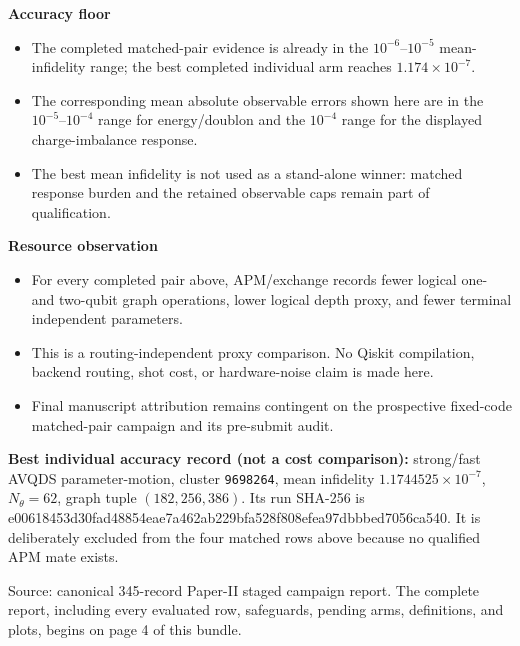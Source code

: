 \documentclass[9pt,letterpaper,landscape]{article}
\newcommand{\statusbox}[2]{\colorbox{#1}{\parbox{0.965\linewidth}{\strut #2\strut}}}
\begin{document}
\vspace{8pt}
\begin{minipage}[t]{0.49\linewidth}
{\large\bfseries\color{navy}Accuracy floor}
\begin{itemize}
  \item The completed matched-pair evidence is already in the \(10^{-6}\)--\(10^{-5}\) mean-infidelity range; the best completed individual arm reaches \(1.174\times10^{-7}\).
  \item The corresponding mean absolute observable errors shown here are in the \(10^{-5}\)--\(10^{-4}\) range for energy/doublon and the \(10^{-4}\) range for the displayed charge-imbalance response.
  \item The best mean infidelity is not used as a stand-alone winner: matched response burden and the retained observable caps remain part of qualification.
\end{itemize}
\end{minipage}\hfill
\begin{minipage}[t]{0.49\linewidth}
{\large\bfseries\color{navy}Resource observation}
\begin{itemize}
  \item For every completed pair above, APM/exchange records fewer logical one- and two-qubit graph operations, lower logical depth proxy, and fewer terminal independent parameters.
  \item This is a routing-independent proxy comparison. No Qiskit compilation, backend routing, shot cost, or hardware-noise claim is made here.
  \item Final manuscript attribution remains contingent on the prospective fixed-code matched-pair campaign and its pre-submit audit.
\end{itemize}
\end{minipage}

\vspace{4pt}
\statusbox{amberpale}{\textbf{Best individual accuracy record (not a cost comparison):} strong/fast AVQDS parameter-motion, cluster \texttt{9698264}, mean infidelity \(1.1744525\times10^{-7}\), \(N_\theta=62\), graph tuple \((182,256,386)\). Its run SHA-256 is {\ttfamily\scriptsize e00618453d30fad48854eae7a462ab229bfa528f808efea97dbbbed7056ca540}. It is deliberately excluded from the four matched rows above because no qualified APM mate exists.}

\vfill
{\footnotesize\color{gray}Source: canonical 345-record Paper-II staged campaign report. The complete report, including every evaluated row, safeguards, pending arms, definitions, and plots, begins on page 4 of this bundle.}
\end{document}
